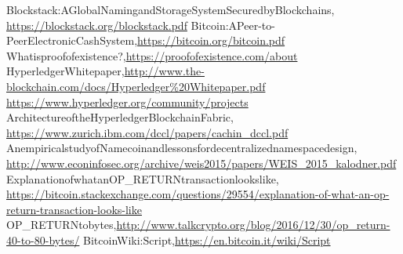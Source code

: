\begin{thebibliography}{99}
Blockstack:\enspace A\enspace Global\enspace Naming\enspace and\enspace Storage\enspace System\enspace Secured\enspace by\enspace Blockchains,\\ \url{https://blockstack.org/blockstack.pdf}
Bitcoin:\enspace A\enspace Peer-to-Peer\enspace Electronic\enspace Cash\enspace System,\enspace \url{https://bitcoin.org/bitcoin.pdf} 
What\enspace is\enspace proof\enspace of\enspace existence\enspace ?,\enspace \url{https://proofofexistence.com/about}
Hyperledger\enspace Whitepaper,\enspace \url{http://www.the-blockchain.com/docs/Hyperledger\%20Whitepaper.pdf} 
\url{https://www.hyperledger.org/community/projects}
Architecture\enspace of\enspace the\enspace Hyperledger\enspace Blockchain\enspace Fabric,\\ \url{https://www.zurich.ibm.com/dccl/papers/cachin_dccl.pdf}
An\enspace empirical\enspace study\enspace of\enspace Namecoin\enspace and\enspace lessons\enspace for\enspace decentralized\enspace namespace\enspace design,\\ \url{http://www.econinfosec.org/archive/weis2015/papers/WEIS_2015_kalodner.pdf}
Explanation\enspace of\enspace what\enspace an\enspace OP\_RETURN\enspace transaction\enspace looks\enspace like,\\ \url{https://bitcoin.stackexchange.com/questions/29554/explanation-of-what-an-op-return-transaction-looks-like}
OP\_RETURN\enspace to\enspace bytes,\enspace \url{http://www.talkcrypto.org/blog/2016/12/30/op_return-40-to-80-bytes/}
Bitcoin\enspace Wiki:\enspace Script,\enspace \url{https://en.bitcoin.it/wiki/Script} 
\end{thebibliography}
